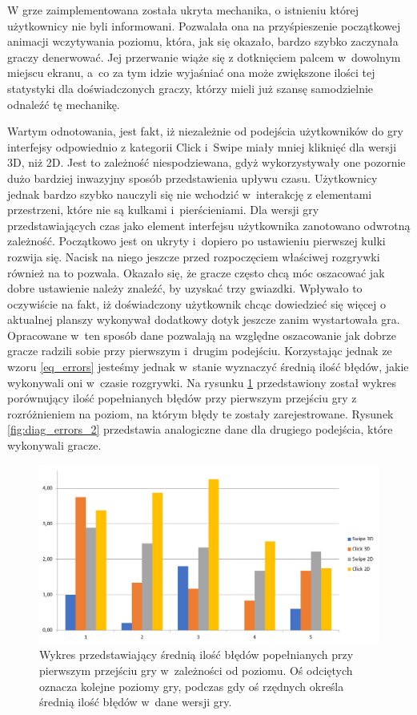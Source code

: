 \documentclass[a4paper,12pt,numbers=noenddot]{report}
\begin{document}
W grze zaimplementowana została ukryta mechanika, o istnieniu której użytkownicy nie byli informowani. Pozwalała ona na przyśpieszenie początkowej animacji wczytywania poziomu, która, jak się okazało, bardzo szybko zaczynała graczy denerwować. Jej przerwanie wiąże się z dotknięciem palcem w~dowolnym miejscu ekranu, a~co za tym idzie wyjaśniać ona może zwiększone ilości tej statystyki dla doświadczonych graczy, którzy mieli już szansę samodzielnie odnaleźć tę mechanikę.

Wartym odnotowania, jest fakt, iż niezależnie od podejścia użytkowników do gry interfejsy odpowiednio z kategorii Click i~Swipe miały mniej kliknięć dla wersji 3D, niż 2D. Jest to zależność niespodziewana, gdyż wykorzystywały one pozornie dużo bardziej inwazyjny sposób przedstawienia upływu czasu. Użytkownicy jednak bardzo szybko nauczyli się nie wchodzić w~interakcję z elementami przestrzeni, które nie są kulkami i~pierścieniami. Dla wersji gry przedstawiających czas jako element interfejsu użytkownika zanotowano odwrotną zależność. Początkowo jest on ukryty i~dopiero po ustawieniu pierwszej kulki rozwija się. Nacisk na niego jeszcze przed rozpoczęciem właściwej rozgrywki również na to pozwala. Okazało się, że gracze często chcą móc oszacować jak dobre ustawienie należy znaleźć, by uzyskać trzy gwiazdki. Wpływało to oczywiście na fakt, iż doświadczony użytkownik chcąc dowiedzieć się więcej o aktualnej planszy wykonywał dodatkowy dotyk jeszcze zanim wystartowała gra.\\

Opracowane w~ten sposób dane pozwalają na względne oszacowanie jak dobrze gracze radzili sobie przy pierwszym i~drugim podejściu. Korzystając jednak ze wzoru \ref{eq_errors} jesteśmy jednak w~stanie wyznaczyć średnią ilość błędów, jakie wykonywali oni w~czasie rozgrywki. 
Na rysunku \ref{fig:diag_errors_1} przedstawiony został wykres porównujący ilość popełnianych błędów przy pierwszym przejściu gry z rozróżnieniem na poziom, na którym błędy te zostały zarejestrowane. Rysunek \ref{fig:diag_errors_2} przedstawia analogiczne dane dla drugiego podejścia, które wykonywali gracze.

\begin{figure}[h!]
	\centering
  	\includegraphics[width=\linewidth]{diag/errors_1.png}
	\caption{Wykres przedstawiający średnią ilość błędów popełnianych przy pierwszym przejściu gry w~zależności od poziomu. Oś odciętych oznacza kolejne poziomy gry, podczas gdy oś rzędnych określa średnią ilość błędów w~dane wersji gry.}
	\label{fig:diag_errors_1}
\end{figure}
\end{document}
